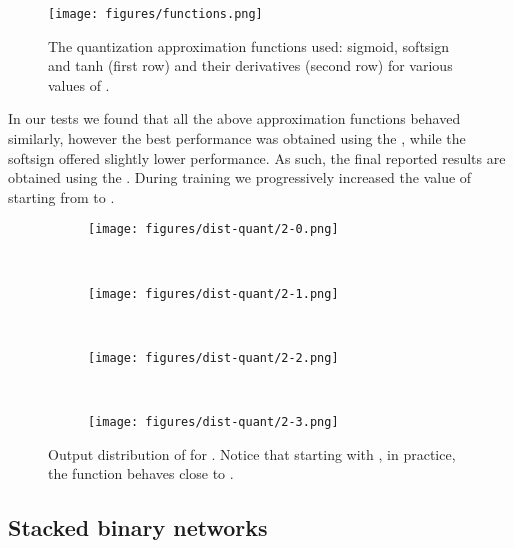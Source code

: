 \documentclass[10pt,twocolumn,letterpaper]{article}
\begin{document}
\begin{figure}[!htbp]
    \centering
    \texttt{[image: figures/functions.png]}
    \caption{The quantization approximation functions used: sigmoid, softsign and tanh (first row) and their derivatives (second row) for various values of .}
    \label{fig:functions-plot}
    \vspace{5pt}
\end{figure}

In our tests we found that all the above approximation functions behaved similarly, however the best performance was obtained using the , while the softsign offered slightly lower performance. As such, the final reported results are obtained using the . During training we progressively increased the value of  starting from  to . \begin{figure*}[!htbp]
    \begin{subfigure}[t]{0.24\textwidth}
    \centering
    \texttt{[image: figures/dist-quant/2-0.png]}
    \caption{}
    \label{fig:lambda-1}
    \end{subfigure}
    ~
    \begin{subfigure}[t]{0.24\textwidth}
    \centering
    \texttt{[image: figures/dist-quant/2-1.png]}
    \caption{}
    \label{fig:lambda-5}
    \end{subfigure}
    ~
    \begin{subfigure}[t]{0.24\textwidth}
    \centering
    \texttt{[image: figures/dist-quant/2-2.png]}
    \caption{}
    \label{fig:lambda-25}
    \end{subfigure}
    ~
    \begin{subfigure}[t]{0.24\textwidth}
    \centering
    \texttt{[image: figures/dist-quant/2-3.png]}
    \caption{}
    \label{fig:lambda-625}
    \end{subfigure}

    \caption{Output distribution of  for . Notice that starting with , in practice, the function behaves close to .}
    \label{fig:lambda-quantization}
\end{figure*}

\subsection{Stacked binary networks}\label{ssec:stacked-binary-nets}
\end{document}

